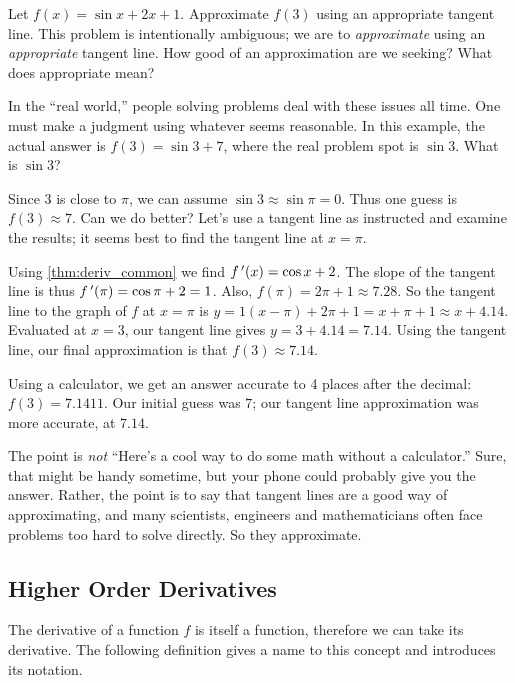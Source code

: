 \begin{example}\label{ex_der2}%
Let $f(x) = \sin x + 2x+1$. Approximate $f(3)$ using an appropriate tangent line.
\solution
This problem is intentionally ambiguous; we are to \emph{approximate} using an \emph{appropriate} tangent line. How good of an approximation are we seeking? What does appropriate mean?

In the ``real world,'' people solving problems deal with these issues all time. One must make a judgment using whatever seems reasonable. In this example, the actual answer is $f(3) = \sin 3 + 7$, where the real problem spot is $\sin 3$. What is $\sin 3$?

Since $3$ is close to $\pi$, we can assume $\sin 3\approx \sin \pi = 0$. Thus one guess is $f(3) \approx 7$. Can we do better? Let's use a tangent line as instructed and examine the results; it seems best to find the tangent line at $x=\pi$. 

Using \autoref{thm:deriv_common} we find $f\,'(x) = \cos x + 2$. The slope of the tangent line is thus $f\,'(\pi) = \cos \pi + 2 =1$. Also, $f(\pi) = 2\pi+1 \approx 7.28$. So the tangent line to the graph of $f$ at $x=\pi$ is $y=1(x-\pi)+ 2\pi+1 =x+\pi+1 \approx x+4.14$. Evaluated at $x=3$, our tangent line gives $y=3+4.14 = 7.14$. Using the tangent line, our final approximation is that $f(3) \approx 7.14$.

Using a calculator, we get an answer accurate to 4 places after the decimal: $f(3) = 7.1411$. Our initial guess was $7$; our tangent line approximation was more accurate, at $7.14$.

The point is \emph{not} ``Here's a cool way to do some math without a calculator.'' Sure, that might be handy sometime, but your phone could probably give you the answer. Rather, the point is to say that tangent lines are a good way of approximating, and many scientists, engineers and mathematicians often face problems too hard to solve directly. So they approximate.
\end{example}

\subsection{Higher Order Derivatives}

The derivative of a function $f$ is itself a function, therefore we can take its derivative. The following definition gives a name to this concept and introduces its notation.

